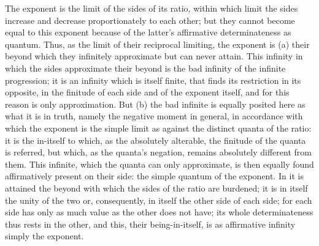 The exponent is the limit of the sides of its ratio,
within which limit the sides increase and decrease
proportionately to each other;
but they cannot become equal to this exponent
because of the latter's affirmative determinateness as quantum.
Thus, as the limit of their reciprocal limiting,
the exponent is (a) their beyond which they
infinitely approximate but can never attain.
This infinity in which the sides approximate their beyond is
the bad infinity of the infinite progression;
it is an infinity which is itself finite,
that finds its restriction in its opposite,
in the finitude of each side
and of the exponent itself,
and for this reason is only approximation.
But (b) the bad infinite is equally posited here
as what it is in truth, namely
the negative moment in general,
in accordance with which the exponent
is the simple limit as against the distinct quanta of the ratio:
it is the in-itself to which, as the absolutely alterable,
the finitude of the quanta is referred,
but which, as the quanta's negation,
remains absolutely different from them.
This infinite, which the quanta can only approximate,
is then equally found affirmatively present on their side:
the simple quantum of the exponent.
In it is attained the beyond with which
the sides of the ratio are burdened;
it is in itself the unity of the two or, consequently,
in itself the other side of each side;
for each side has only as much value
as the other does not have;
its whole determinateness thus rests in the other,
and this, their being-in-itself, is as affirmative infinity
simply the exponent.

